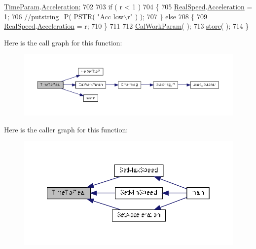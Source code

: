 \begin{DoxyCode}
      \hyperlink{drv__8825_8c_a7d20b8cec6f96108790d4bf76b9c469d}{TimeParam}.\hyperlink{structMotor__Parameters_aa9f1146edc6d945d535eec80a01481f1}{Acceleration};
702 
703     if ( r < 1 )
704     \{
705         \hyperlink{drv__8825_8c_a2e720ed1ed0ef90dba27c1f246048dcd}{RealSpeed}.\hyperlink{structMotor__Parameters_aa9f1146edc6d945d535eec80a01481f1}{Acceleration} = 1;
706         \textcolor{comment}{//putstring\_P( PSTR( "Acc low\(\backslash\)r" ) );}
707     \} \textcolor{keywordflow}{else}
708     \{
709         \hyperlink{drv__8825_8c_a2e720ed1ed0ef90dba27c1f246048dcd}{RealSpeed}.\hyperlink{structMotor__Parameters_aa9f1146edc6d945d535eec80a01481f1}{Acceleration} = r;
710     \}
711 
712     \hyperlink{group__biba__drv_ga3389079a7106f1e741c0bc447dfbcbca}{CalWorkParam}( );
713     \hyperlink{group__biba__drv_gaaefaac2ed4c54f2008d8d236392c7261}{store}( );
714 \}
\end{DoxyCode}


Here is the call graph for this function\-:
\nopagebreak
\begin{figure}[H]
\begin{center}
\leavevmode
\includegraphics[width=350pt]{group__biba__drv_gaec239a01fef85140bc7c12fa612f421b_cgraph}
\end{center}
\end{figure}




Here is the caller graph for this function\-:
\nopagebreak
\begin{figure}[H]
\begin{center}
\leavevmode
\includegraphics[width=350pt]{group__biba__drv_gaec239a01fef85140bc7c12fa612f421b_icgraph}
\end{center}
\end{figure}


